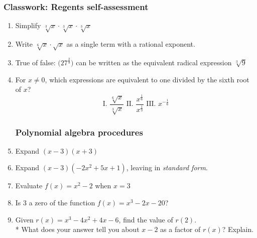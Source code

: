 \documentclass[12pt, twoside]{article}
\begin{document}
\subsubsection*{Classwork: Regents self-assessment}
  \begin{enumerate}

\subsubsection*{Rational exponents and radicals}
  \item Simplify $\sqrt[3]{x} \cdot \sqrt[3]{x} \cdot \sqrt[3]{x}$  \vspace{3.5cm}
  \item Write $\sqrt[6]{x} \cdot \sqrt{x}$ as a single term with a rational exponent. \vspace{3.5cm}

  \item True of false:  $\displaystyle \big( 27^\frac{2}{9} \big) $ can be written as the equivalent radical expression $\sqrt[3]9$ \vspace{3.5cm}

  \item For $x \neq 0$, which expressions are equivalent to one divided by the sixth root of $x$?
  \[ \text{I. } \frac{\sqrt[6]{x}}{\sqrt[3]{x}} \text{  II. } \frac{x^{\frac{1}{6}}}{x^{\frac{1}{3}}} \text{  III. } x^{-\frac{1}{6}} \]
   \vspace{3.5cm}

\newpage
\subsubsection*{Polynomial algebra procedures}
  \item Expand $(x-3)(x+3)$ \vspace{2.5cm}
  \item Expand $(x-3)(-2x^2+5x+1)$, leaving in \emph{standard form}. \vspace{4.5cm}
  \item Evaluate $f(x)=x^2-2$ when $x=3$ \vspace{2cm}
  \item Is 3 a zero of the function $f(x)=x^3-2x-20$? \vspace{3cm}

  \item Given $r(x)=x^3-4x^2+4x-6$, find the value of $r(2)$.\\*
  What does your answer tell you about $x-2$ as a factor of $r(x)$? Explain. \vspace{4.5cm}


\end{enumerate}
\end{document}
